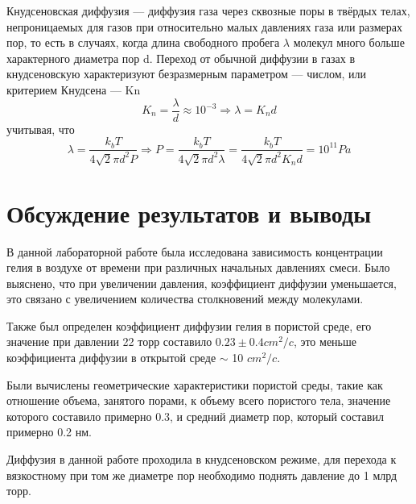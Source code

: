\documentclass[a4paper,12pt]{article}
\begin{document}
Кнудсеновская диффузия — диффузия газа через сквозные поры в твёрдых телах, непроницаемых для газов при относительно малых давлениях газа или размерах пор, то есть в случаях, когда длина свободного пробега $\lambda $ молекул много больше характерного диаметра пор d. Переход от обычной диффузии в газах в кнудсеновскую характеризуют безразмерным параметром — числом, или критерием Кнудсена — Kn
\[ K_n = \frac{\lambda }{d} \approx 10^{-3}\Rightarrow \lambda = K_n  d\]
учитывая, что 
\[ \lambda = \frac{k_b  T}{4\sqrt{2}\pi d^{2} P}\Rightarrow P = \frac{k_b  T}{4\sqrt{2}\pi d^{2} \lambda } = \frac{k_b  T}{4\sqrt{2}\pi d^{2} K_n d} = 10^{11} Pa\]

\section{Обсуждение результатов и выводы}

В данной лабораторной работе была исследована зависимость концентрации гелия в воздухе от времени при различных начальных давлениях смеси. Было выяснено, что при увеличении давления, коэффициент диффузии уменьшается, это связано с увеличением количества столкновений между молекулами. 

Также был определен коэффициент диффузии гелия в пористой среде, его значение при давлении 22 торр составило $0.23\pm 0.4 cm^2/c $, это меньше коэффициента диффузии в открытой среде $\sim $ 10 $cm^2/c$. 

Были вычислены геометрические характеристики пористой среды, такие как отношение объема, занятого порами, к объему всего пористого тела, значение которого составило примерно 0.3, и средний диаметр пор, который составил примерно 0.2 нм. 

Диффузия в данной работе проходила в кнудсеновском режиме, для перехода к вязкостному при том же диаметре пор необходимо поднять давление до 1 млрд торр.
\end{document}
